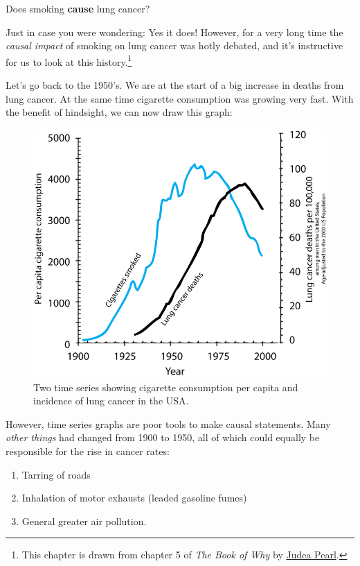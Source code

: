 \documentclass[]{book}
\providecommand{\tightlist}{%
  \setlength{\itemsep}{0pt}\setlength{\parskip}{0pt}}
\let\rmarkdownfootnote\footnote%
\def\footnote{\protect\rmarkdownfootnote}
\newenvironment{warning}{\begin{tcolorbox}[colback=orange!5!white,colframe=orange]}{\end{tcolorbox}}
\begin{document}
\begin{warning}
Does smoking \textbf{cause} lung cancer?
\end{warning}

Just in case you were wondering: Yes it does! However, for a very long
time the \emph{causal impact} of smoking on lung cancer was hotly
debated, and it's instructive for us to look at this history.\footnote{This
  chapter is drawn from chapter 5 of \emph{The Book of Why} by
  \href{http://bayes.cs.ucla.edu/jp_home.html}{Judea Pearl}.}

Let's go back to the 1950's. We are at the start of a big increase in
deaths from lung cancer. At the same time cigarette consumption was
growing very fast. With the benefit of hindsight, we can now draw this
graph:

\begin{figure}

{\centering \includegraphics[width=9.86in]{images/Smoking_lung_cancer} 

}

\caption{Two time series showing cigarette consumption per capita and incidence of lung cancer in the USA.}\label{fig:smoking-cancer}
\end{figure}

However, time series graphs are poor tools to make causal statements.
Many \emph{other things} had changed from 1900 to 1950, all of which
could equally be responsible for the rise in cancer rates:

\begin{enumerate}
\def\labelenumi{\arabic{enumi}.}
\tightlist
\item
  Tarring of roads
\item
  Inhalation of motor exhausts (leaded gasoline fumes)
\item
  General greater air pollution.
\end{enumerate}
\end{document}
